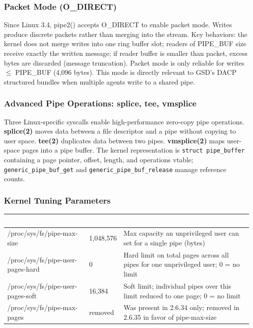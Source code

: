 \documentclass[11pt,letterpaper]{article}
\newcommand{\tableheader}[1]{\textbf{\sffamily\textcolor{white}{#1}}}
\begin{document}
\subsubsection{Packet Mode (O\_DIRECT)}

Since Linux 3.4, pipe2() accepts O\_DIRECT to enable packet mode. Writes produce discrete packets rather than merging into the stream. Key behaviors: the kernel does not merge writes into one ring buffer slot; readers of PIPE\_BUF size receive exactly the written message; if reader buffer is smaller than packet, excess bytes are discarded (message truncation). Packet mode is only reliable for writes $\leq$ PIPE\_BUF (4,096 bytes). This mode is directly relevant to GSD's DACP structured bundles when multiple agents write to a shared pipe.

\subsubsection{Advanced Pipe Operations: splice, tee, vmsplice}

Three Linux-specific syscalls enable high-performance zero-copy pipe operations. \textbf{splice(2)} moves data between a file descriptor and a pipe without copying to user space. \textbf{tee(2)} duplicates data between two pipes. \textbf{vmsplice(2)} maps user-space pages into a pipe buffer. The kernel representation is \texttt{struct pipe\_buffer} containing a page pointer, offset, length, and operations vtable; \texttt{generic\_pipe\_buf\_get} and \texttt{generic\_pipe\_buf\_release} manage reference counts.

\subsubsection{Kernel Tuning Parameters}

\begin{center}
\begin{tabularx}{\textwidth}{L{5cm}L{2cm}X}
\toprule
{}
\tableheader{Parameter} & \tableheader{Default} & \tableheader{Effect} \\
\midrule
/proc/sys/fs/pipe-max-size & 1,048,576 & Max capacity an unprivileged user can set for a single pipe (bytes) \\
/proc/sys/fs/pipe-user-pages-hard & 0 & Hard limit on total pages across all pipes for one unprivileged user; 0 = no limit \\
/proc/sys/fs/pipe-user-pages-soft & 16,384 & Soft limit; individual pipes over this limit reduced to one page; 0 = no limit \\
/proc/sys/fs/pipe-max-pages & removed & Was present in 2.6.34 only; removed in 2.6.35 in favor of pipe-max-size \\
\bottomrule
\end{tabularx}
\end{center}
\end{document}
